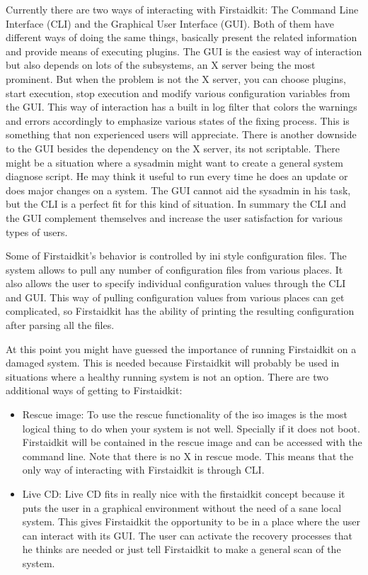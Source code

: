 \documentclass[a4paper,13pt]{article}
\begin{document}
Currently there are two ways of interacting with Firstaidkit: The Command Line Interface (CLI) and the Graphical User Interface (GUI).  Both of them have different ways of doing the same things, basically present the related information and provide means of executing plugins.  The GUI is the easiest way of interaction but also depends on lots of the subsystems, an X server being the most prominent.  But when the problem is not the X server, you can choose plugins, start execution, stop execution and modify various configuration variables from the GUI.  This way of interaction has a built in log filter that colors the warnings and errors accordingly to emphasize various states of the fixing process.  This is something that non experienced users will appreciate.  There is another downside to the GUI besides the dependency on the X server, its not scriptable.  There might be a situation where a sysadmin might want to create a general system diagnose script.  He may think it useful to run every time he does an update or does major changes on a system.  The GUI cannot aid the sysadmin in his task, but the CLI is a perfect fit for this kind of situation.  In summary the CLI and the GUI complement themselves and increase the user satisfaction for various types of users.

Some of Firstaidkit's behavior is controlled by ini style configuration files.  The system allows to pull any number of configuration files from various places.  It also allows the user to specify individual configuration values through the CLI and GUI.  This way of pulling configuration values from various places can get complicated, so Firstaidkit has the ability of printing the resulting configuration after parsing all the files.

At this point you might have guessed the importance of running Firstaidkit on a damaged system.  This is needed because Firstaidkit will probably be used in situations where a healthy running system is not an option.  There are two additional ways of getting to Firstaidkit:

\begin{itemize}
\item Rescue image:
To use the rescue functionality of the iso images is the most logical thing to do when your system is not well.  Specially if it does not boot.  Firstaidkit will be contained in the rescue image and can be accessed with the command line.  Note that there is no X in rescue mode.  This means that the only way of interacting with Firstaidkit is through CLI.
\item Live CD:
Live CD fits in really nice with the firstaidkit concept because it puts the user in a graphical environment without the need of a sane local system.  This gives Firstaidkit the opportunity to be in a place where the user can interact with its GUI.  The user can activate the recovery processes that he thinks are needed or just tell Firstaidkit to make a general scan of the system.
\end{itemize}
\end{document}
